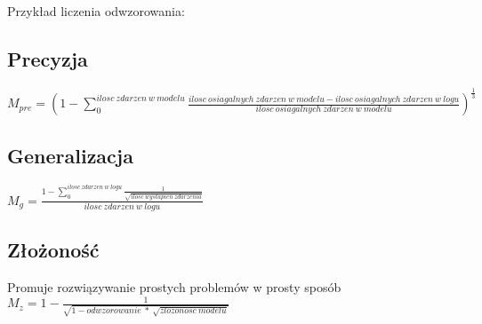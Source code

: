 Przykład liczenia odwzorowania: \newline

\subsection{Precyzja}

$M_{pre} = (1 - \sum_{0}^{ilosc\ zdarzen\ w\ modelu} \frac{ilosc\ osiagalnych\ zdarzen\ w\ modelu - ilosc\ osiagalnych\ zdarzen\ w\ logu}{ilosc\ osiagalnych\ zdarzen\ w\ modelu})^{\frac{1}{3}} $
\subsection{Generalizacja}
$M_g = \frac{1 - \sum_{0}^{ilosc\ zdarzen\ w\ logu} \frac{1}{\sqrt{ilosc\ wystapien\ zdarzenia}}}{ilosc\ zdarzen\ w\ logu} $
\subsection{Złożoność}
Promuje rozwiązywanie prostych problemów w prosty sposób \newline
$M_z = 1 - \frac{1}{\sqrt{1 - odwzorowanie\ *\ \sqrt{zlozonosc\ modelu}}} $
